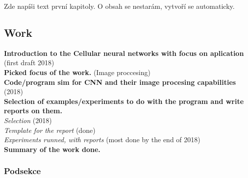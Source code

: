 Zde napíši text první kapitoly. O obsah se nestarám, vytvoří se automaticky.

\subsection{Work}
\textbf{Introduction to the Cellular neural networks with focus on aplication} (first draft 2018)\\
\textbf{Picked focus of the work.} (Image proccesing) \\
\textbf{Code/program sim for CNN and their image procesing capabilities} (2018)\\
\textbf{Selection of examples/experiments to do with the program and write reports on them.} \\
	\textit{Selection} (2018)\\
	\textit{Template for the report} (done)  \\
	\textit{Experiments runned, with reports} (most done by the end of 2018)\\
\textbf{Summary of the work done. }	\\

\subsubsection{Podsekce}
